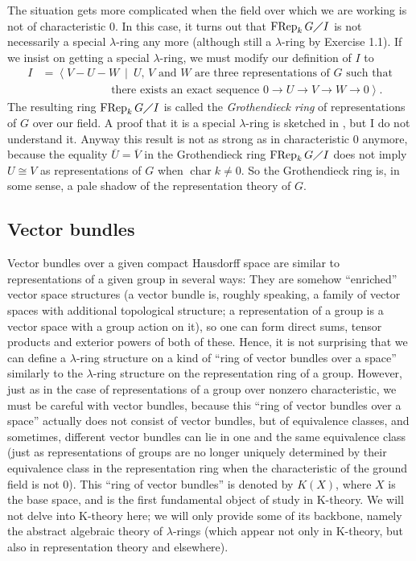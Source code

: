 \documentclass[numbers=enddot,12pt,final,onecolumn,notitlepage]{scrartcl}%
\begin{document}
The situation gets more complicated when the field over which we are working
is not of characteristic $0$. In this case, it turns out that
$\operatorname*{FRep}_{k}G\diagup I$ is not necessarily a special $\lambda
$-ring any more (although still a $\lambda$-ring by Exercise 1.1). If we
insist on getting a special $\lambda$-ring, we must modify our definition of
$I$ to%
\begin{align*}
I  &  =\left\langle V-U-W\ \mid\ U\text{, }V\text{ and }W\text{ are three
representations of }G\text{ such that}\right. \\
&  \ \ \ \ \ \ \ \ \ \ \ \ \ \ \ \ \ \ \ \ \ \ \ \ \ \ \ \ \left.  \text{there
exists an exact sequence }0\rightarrow U\rightarrow V\rightarrow
W\rightarrow0\right\rangle .
\end{align*}
The resulting ring $\operatorname*{FRep}_{k}G\diagup I$ is called the
\textit{Grothendieck ring} of representations of $G$ over our field. A proof
that it is a special $\lambda$-ring is sketched in \cite[Example on page
95]{Seiler88}, but I do not understand it. Anyway this result is not as strong
as in characteristic $0$ anymore, because the equality $\overline{U}%
=\overline{V}$ in the Grothendieck ring $\operatorname*{FRep}_{k}G\diagup I$
does not imply $U\cong V$ as representations of $G$ when $\operatorname*{char}%
k\neq0$. So the Grothendieck ring is, in some sense, a pale shadow of the
representation theory of $G$.

\subsection{Vector bundles}

Vector bundles over a given compact Hausdorff space are similar to
representations of a given group in several ways: They are somehow
``enriched'' vector space structures (a vector bundle is, roughly speaking, a
family of vector spaces with additional topological structure; a
representation of a group is a vector space with a group action on it), so one
can form direct sums, tensor products and exterior powers of both of these.
Hence, it is not surprising that we can define a $\lambda$-ring structure on a
kind of ``ring of vector bundles over a space'' similarly to the $\lambda
$-ring structure on the representation ring of a group. However, just as in
the case of representations of a group over nonzero characteristic, we must be
careful with vector bundles, because this ``ring of vector bundles over a
space'' actually does not consist of vector bundles, but of equivalence
classes, and sometimes, different vector bundles can lie in one and the same
equivalence class (just as representations of groups are no longer uniquely
determined by their equivalence class in the representation ring when the
characteristic of the ground field is not $0$). This ``ring of vector
bundles'' is denoted by $K\left(  X\right)  $, where $X$ is the base space,
and is the first fundamental object of study in K-theory. We will not delve
into K-theory here; we will only provide some of its backbone, namely the
abstract algebraic theory of $\lambda$-rings (which appear not only in
K-theory, but also in representation theory and elsewhere).
\end{document}
